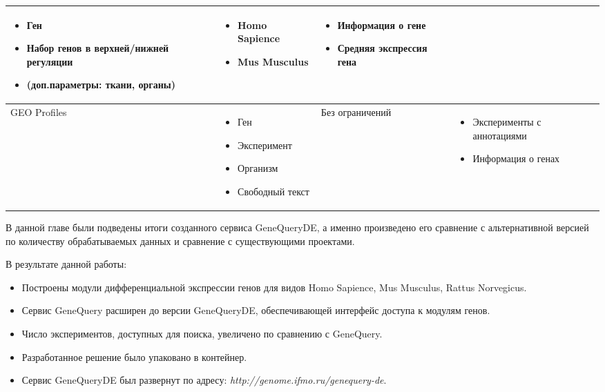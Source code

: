 \documentclass[times,specification,annotation]{itmo-student-thesis}
\begin{document}
\begin{table}
\begin{tabu}{ |X[l]|m{6.7cm}|m{6.7cm}|m{6.7cm}|}
\begin{itemize}
            \item Ген
            \item Набор генов в верхней/нижней регуляции
            \item (доп.параметры: ткани, органы)
        \end{itemize} & \begin{itemize}
            \item Homo Sapience
            \item Mus Musculus
        \end{itemize} & \begin{itemize}
            \item Информация о гене
            \item Средняя экспрессия гена
        \end{itemize}\\ 
        \hline
         GEO Profiles & \begin{itemize}
            \item Ген
            \item Эксперимент
            \item Организм
            \item Свободный текст
        \end{itemize} & Без ограничений & \begin{itemize}
            \item Эксперименты с аннотациями
            \item Информация о генах
        \end{itemize}\\ 
        \hline
    \end{tabu}
\end{table}

\chapterconclusion

В данной главе были подведены итоги созданного сервиса GeneQueryDE, а именно произведено его сравнение с альтернативной версией по количеству обрабатываемых данных и сравнение с существующими проектами. 
  

\startconclusionpage

В результате данной работы:
\begin{itemize}
    \item Построены модули дифференциальной экспрессии генов для видов Homo Sapience, Mus Musculus, Rattus Norvegicus.
    \item Сервис GeneQuery расширен до версии GeneQueryDE, обеспечивающей интерфейс доступа к модулям генов. 
    \item Число экспериментов, доступных для поиска, увеличено по сравнению с GeneQuery. 
    \item Разработанное решение было упаковано в контейнер.
    \item Сервис GeneQueryDE был развернут по адресу: \textit{http://genome.ifmo.ru/genequery-de}.​
\end{itemize}

\printmainbibliography
\end{document}
